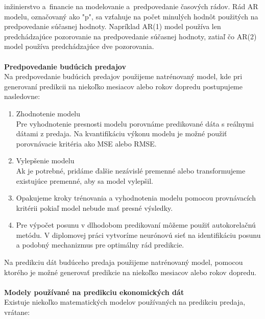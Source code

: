     inžinierstvo a~financie na modelovanie a~predpovedanie časových rádov. Rád AR modelu, označovaný
    ako "p", sa vzťahuje na počet minulých hodnôt použitých na predpovedanie súčasnej hodnoty. Napríklad AR(1) model
    používa len predchádzajúce pozorovanie na predpovedanie súčasnej hodnoty, zatiaľ čo AR(2) model používa predchádzajúce
    dve pozorovania.\\
    \\
    \textbf{Predpovedanie budúcich predajov}\\
    Na predpovedanie budúcich predajov použijeme natrénovaný model, kde pri generovaní predikcii na niekoľko
    mesiacov alebo rokov dopredu postupujeme nasledovne:
    \begin{enumerate}
        \item Zhodnotenie modelu\\
        Pre vyhodnotenie presnosti modelu porovnáme predikované dáta s reálnymi dátami z predaja. Na kvantifikáciu výkonu modelu 
        je možné použiť porovnávacie kritéria ako MSE alebo RMSE. 
        \item Vylepšenie modelu\\
        Ak je potrebné, pridáme ďalšie nezávislé premenné alebo transformujeme existujúce premenné, aby sa model vylepšil.
        \item Opakujeme kroky trénovania a vyhodnotenia modelu pomocou provnávacích kritérii pokiaľ model nebude mať presné výsledky. 
        \item Pre výpočet posunu v dlhodobom predikovaní môžeme použiť autokorelačnú metódu. V diplomovej práci vytvoríme 
        neurónovú sieť na identifikáciu posunu a podobný mechanizmus pre optimálny rád predikcie.
    \end{enumerate}
    Na predikciu dát budúceho predaja použijeme natrénovaný model, pomocou ktorého je možné generovať predikcie na niekoľko
    mesiacov alebo rokov dopredu.\\
    \\
    \textbf{Modely používané na predikciu ekonomických dát} \\
    Existuje niekoľko matematických modelov používaných na predikciu predaja, vrátane:\\
